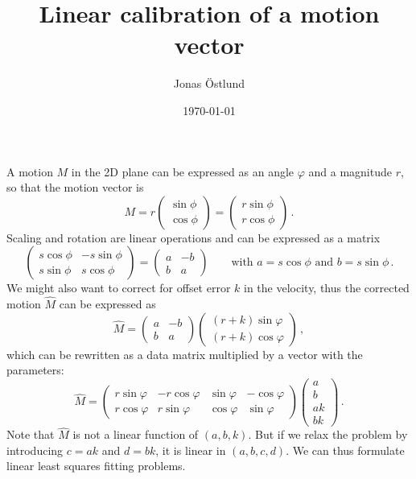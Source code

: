 \documentclass{article}
\author{Jonas Östlund}
\date{\today}
\title{Linear calibration of a motion vector}
\newcommand{\mat}[2]{\left( \begin{array}{#1} #2 \end{array} \right)}
\begin{document}
\maketitle

A motion $M$ in the 2D plane can be expressed as an angle $\varphi$ and a magnitude $r$, so that the motion vector is
\begin{displaymath}
  M = r\mat{c}{
    \sin \phi \\
    \cos \phi
   } =
  \mat{c}{
    r \sin \phi \\
    r \cos \phi
    } \, .
\end{displaymath}
Scaling and rotation are linear operations and can be expressed as a matrix
\begin{displaymath}
\mat{cc}{
  s\cos \phi & -s \sin \phi \\
  s\sin \phi & s \cos \phi
} = \mat{cc}{a & -b \\ b & a} \qquad \text{with $a = s\cos \phi$ and $b = s\sin \phi$} \, .
\end{displaymath}
We might also want to correct for offset error $k$ in the velocity, thus the corrected motion $\hat{M}$ can be expressed as
\begin{displaymath}
\hat{M} = \mat{cc}{a & -b \\ b & a}\mat{c}{(r + k)\sin \varphi \\ (r + k)\cos \varphi} \, ,
\end{displaymath}
which can be rewritten as a data matrix multiplied by a vector with the parameters:
\begin{displaymath}
\hat{M} = \mat{cccc}{r\sin \varphi & -r \cos \varphi & 
  \sin \varphi & -\cos \varphi \\
  r\cos \varphi & r\sin \varphi & \cos \varphi & \sin \varphi}
\mat{c}{a \\ b \\ ak \\ bk} \, .
\end{displaymath}
Note that $\hat{M}$ is not a linear function of $(a, b, k)$. But if we relax the problem by introducing $c = ak$ and $d = bk$, it is linear in $(a, b, c, d)$. We can thus formulate linear least squares fitting problems.
\end{document}
